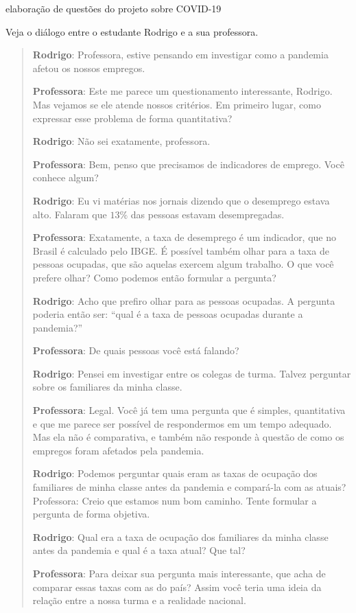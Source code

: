 \begin{task}{elaboração de questões do projeto sobre COVID-19}

Veja o diálogo entre o estudante Rodrigo e a sua professora.

\begin{quote}
\textbf{Rodrigo}: Professora, estive pensando em investigar como a pandemia afetou os nossos empregos.

\textbf{Professora}: Este me parece um questionamento interessante, Rodrigo. Mas vejamos se ele atende nossos critérios. Em primeiro lugar, como expressar esse problema de forma quantitativa?

\textbf{Rodrigo}: Não sei exatamente, professora.

\textbf{Professora}: Bem, penso que precisamos de indicadores de emprego. Você conhece algum?

\textbf{Rodrigo}: Eu vi matérias nos jornais dizendo que o desemprego estava alto. Falaram que $13\%$ das pessoas estavam desempregadas.

\textbf{Professora}: Exatamente, a taxa de desemprego é um indicador, que no Brasil é calculado pelo IBGE. É possível também olhar para a taxa de pessoas ocupadas, que são aquelas exercem algum trabalho. O que você prefere olhar? Como podemos então formular a pergunta?

\textbf{Rodrigo}: Acho que prefiro olhar para as pessoas ocupadas. A pergunta poderia então ser: “qual é a taxa de pessoas ocupadas durante a pandemia?”

\textbf{Professora}: De quais pessoas você está falando?

\textbf{Rodrigo}: Pensei em investigar entre os colegas de turma. Talvez perguntar sobre os familiares da minha classe. 

\textbf{Professora}: Legal. Você já tem uma pergunta que é simples, quantitativa e que me parece ser possível de respondermos em um tempo adequado. Mas ela não é comparativa, e também não responde à questão de como os empregos foram afetados pela pandemia.

\textbf{Rodrigo}: Podemos perguntar quais eram as taxas de ocupação dos familiares de minha classe antes da pandemia e compará-la com as atuais?
Professora: Creio que estamos num bom caminho. Tente formular a pergunta de forma objetiva.

\textbf{Rodrigo}: Qual era a taxa de ocupação dos familiares da minha classe antes da pandemia e qual é a taxa atual? Que tal?

\textbf{Professora}: Para deixar sua pergunta mais interessante, que acha de comparar essas taxas com as do país? Assim você teria uma ideia da relação entre a nossa turma e a realidade nacional.


\end{quote}
\end{task}
